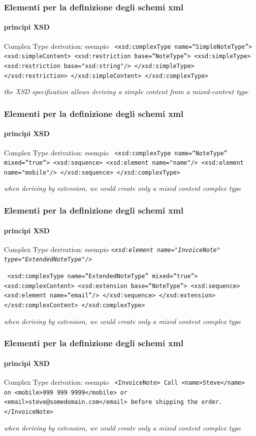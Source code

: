 \begin{frame}
	\frametitle{Elementi per la definizione degli schemi xml}
	\framesubtitle{principi XSD}
	\addtocounter{nframe}{1}

	\begin{block}{Complex Type derivation: esempio}
		\texttt{
			<xsd:complexType name=``SimpleNoteType''>
			<xsd:simpleContent>
			<xsd:restriction base=``NoteType''>
			<xsd:simpleType>
			<xsd:restriction base="xsd:string"/>
			</xsd:simpleType>
			</xsd:restriction>
			</xsd:simpleContent>
			</xsd:complexType>
		}
	\end{block}
	\textit{the XSD specification allows deriving a simple content from a mixed-content type}
\end{frame}



\begin{frame}
	\frametitle{Elementi per la definizione degli schemi xml}
	\framesubtitle{principi XSD}
	\addtocounter{nframe}{1}

	\begin{block}{Complex Type derivation: esempio}
		\texttt{
			<xsd:complexType name=``NoteType'' mixed=``true''>
			<xsd:sequence>
			<xsd:element name="name"/>
			<xsd:element name="mobile"/>
			</xsd:sequence>
			</xsd:complexType>
		}
	\end{block}
	\textit{when deriving by extension, we could create only a mixed content complex type}
\end{frame}


\begin{frame}
	\frametitle{Elementi per la definizione degli schemi xml}
	\framesubtitle{principi XSD}
	\addtocounter{nframe}{1}

	\begin{block}{Complex Type derivation: esempio}
		\texttt{\emph{<xsd:element name="InvoiceNote" type="ExtendedNoteType"/>}}


		\texttt{
			<xsd:complexType name=``ExtendedNoteType'' mixed=``true''>
			<xsd:complexContent>
			<xsd:extension base=``NoteType''>
			<xsd:sequence>
			<xsd:element name=``email''/>
			</xsd:sequence>
			</xsd:extension>
			</xsd:complexContent>
			</xsd:complexType>
		}
	\end{block}
	\textit{when deriving by extension, we could create only a mixed content complex type}
\end{frame}

\begin{frame}
	\frametitle{Elementi per la definizione degli schemi xml}
	\framesubtitle{principi XSD}
	\addtocounter{nframe}{1}

	\begin{block}{Complex Type derivation: esempio}
		\texttt{
			<InvoiceNote>
			Call <name>Steve</name> on <mobile>999 999 9999</mobile> or <email>steve@somedomain.com</email> before shipping the order.
			</InvoiceNote>
		}
	\end{block}
	\textit{when deriving by extension, we could create only a mixed content complex type}
\end{frame}

